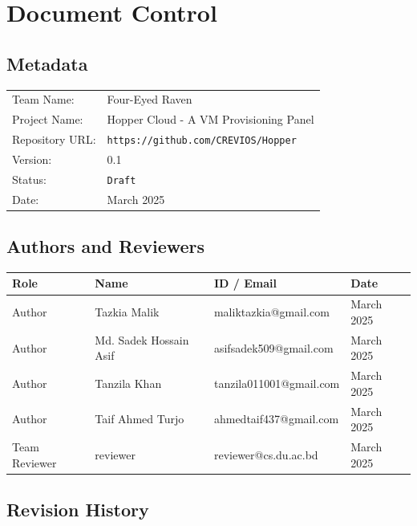 \documentclass[12pt,a4paper]{article}
\begin{document}
\pagecolor{white}
\color{black}

\newpage
\setcounter{tocdepth}{3}
\tableofcontents

\newpage

\section{Document Control}
\subsection{Metadata}

\begin{tabularx}{\textwidth}{@{}L{4cm}X@{}}
    Team Name:       & Four-Eyed Raven \\
    Project Name:    & Hopper Cloud - A VM Provisioning Panel \\
  Repository URL:  & \texttt{https://github.com/CREVIOS/Hopper} \\
    Version:         & 0.1 \\
  Status:          & \texttt{Draft} \\
    Date:            & March 2025 \\
\end{tabularx}

\subsection{Authors and Reviewers}

\begin{tabularx}{\textwidth}{@{}L{3cm}L{4cm}L{5cm}L{3cm}@{}}
  \textbf{Role} & \textbf{Name} & \textbf{ID / Email} & \textbf{Date} \\
  \midrule
    Author          & {Tazkia Malik}         & maliktazkia@gmail.com     & March 2025 \\
    Author          & {Md. Sadek Hossain Asif}         & asifsadek509@gmail.com     & March 2025 \\
    Author          & {Tanzila Khan}         & tanzila011001@gmail.com     & March 2025 \\
    Author          & {Taif Ahmed Turjo}         & ahmedtaif437@gmail.com     & March 2025 \\
  Team Reviewer   & {reviewer}       & reviewer@cs.du.ac.bd    & March 2025
\end{tabularx}

\subsection{Revision History}
\end{document}
